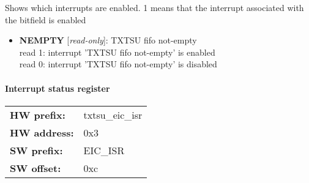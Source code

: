 \vspace{12pt}
Shows which interrupts are enabled. 1 means that the interrupt associated with the bitfield is enabled

\vspace{12pt}
\noindent
{}

\begin{itemize}
\item \begin{small}
{\bf 
NEMPTY
} [\emph{read-only}]: TXTSU fifo not-empty
\\
read 1: interrupt 'TXTSU fifo not-empty' is enabled\\read 0: interrupt 'TXTSU fifo not-empty' is disabled
\end{small}
\end{itemize}
\paragraph*{Interrupt status register}\vspace{12pt}

\begin{tabular}{l l }
{\bf HW prefix:}  & txtsu\_eic\_isr\\
{\bf HW address:}  & 0x3\\
{\bf SW prefix:}  & EIC\_ISR\\
{\bf SW offset:}  & 0xc\\
\end{tabular}


